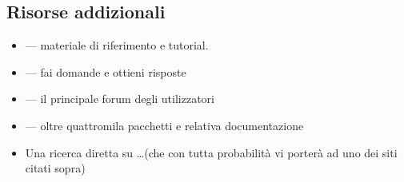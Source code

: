 \documentclass{beamer}
\begin{document}

\subsection{Risorse addizionali}
\begin{frame}{\insertsubsection}
\begin{itemize}
\item {} ---
materiale di riferimento e tutorial.
\item{} --- fai domande e ottieni risposte
\item {} --- il principale forum degli utilizzatori
\item {} ---
oltre quattromila pacchetti e relativa documentazione
\item Una ricerca diretta su \ldots (che con tutta probabilit\`a vi porter\`a ad uno dei siti citati sopra)
\end{itemize}
\end{frame}
\end{document}

